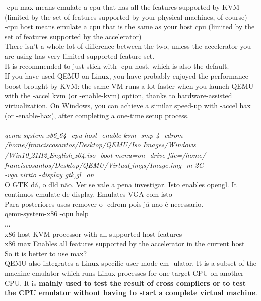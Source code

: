 \documentclass[11pt, a4paper, oneside]{article}
\theoremstyle{definition}
\begin{document}
-cpu max means emulate a cpu that has all the features supported by KVM (limited by the set of features supported by your physical machines, of course)\\

-cpu host means emulate a cpu that is the same as your host cpu (limited by the set of features supported by the accelerator)\\

There isn't a whole lot of difference between the two, unless the accelerator you are using has very limited supported feature set.\\

It is recommended to just stick with -cpu host, which is also the default.\\
If you have used QEMU on Linux, you have probably enjoyed the performance boost brought by KVM: the same VM runs a lot faster when you launch QEMU with the -accel kvm (or -enable-kvm) option, thanks to hardware-assisted virtualization. On Windows, you can achieve a similar speed-up with -accel hax (or -enable-hax), after completing a one-time setup process.\\
\\
\textit{qemu-system-x86$\_$64 -cpu host -enable-kvm -smp 4 -cdrom \\/home/franciscosantos/Desktop/QEMU/Iso$\_$Images/Windows\\/Win10$\_$21H2$\_$English$\_$x64.iso -boot menu=on -drive file=/home/\\franciscosantos/Desktop/QEMU/Virtual$\_$imgs/Image.img -m 2G\\ -vga virtio -display gtk,gl=on}\\
O GTK dá, o dld não. Ver se vale a pena investigar. Isto enables opengl. It continuos emulate de display.
Emulates VGA com isto\\

Para posteriores usos remover o -cdrom pois já nao é necessario.\\

qemu-system-x86 -cpu help\\
...\\
x86 host KVM processor with all supported host features\\
x86 max Enables all features supported by the accelerator in the current host\\
So it is better to use max?\\
QEMU also integrates a Linux specific user mode em- ulator. It is a subset of the machine emulator which runs Linux processes for one target CPU on another CPU. It is \textbf{mainly used to test the result of cross compilers or to test the CPU emulator without having to start a complete virtual machine}.\\
\end{document}

